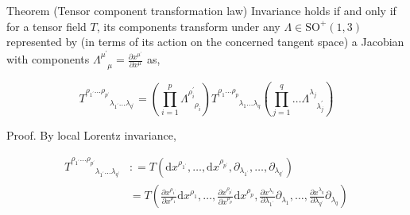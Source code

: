 \documentclass[9pt,handout]{beamer}
\begin{document}
\begin{frame}
\begin{block}{Theorem (Tensor component transformation law)}
Invariance holds if and only if for a tensor field $T$, its components transform under any $\Lambda \in \text{SO}^+ \left( 1, 3 \right)$ represented by (in terms of its action on the concerned tangent space) a Jacobian with components $\displaystyle{\Lambda^{\mu^\prime}_{\phantom{\mu^\prime} \mu} = \frac{\partial x^{\mu^\prime}}{\partial x^\mu}}$ as,

$$T^{\rho_{1^\prime} \dots \rho_{p^\prime}}_{\phantom{\rho_{1^\prime} \dots \rho_{p^\prime}} \lambda_{1^\prime} \dots \lambda_{q^\prime}} = \left( \prod_{i=1}^{p} \Lambda^{\rho_i^\prime}_{\phantom{\rho_i^\prime} \rho_i} \right) T^{\rho_1 \dots \rho_p}_{\phantom{\rho_1 \dots \rho_p} \lambda_1 \dots \lambda_q} \left( \prod_{j=1}^{q} \dots \Lambda^{\lambda_j}_{\phantom{\lambda_j} \lambda_j^\prime} \right)$$
\end{block}

\begin{block}{Proof.}
By local Lorentz invariance,

\begin{align*}
T^{\rho_{1^\prime} \dots \rho_{p^\prime}}_{\phantom{\rho_{1^\prime} \dots \rho_{p^\prime}} \lambda_{1^\prime} \dots \lambda_{q^\prime}} & : = T \left( \text{d}x^{\rho_{1^\prime}}, \dots, \text{d}x^{\rho_{p^\prime}}, \partial_{\lambda_{1^\prime}}, \dots, \partial_{\lambda_{q^\prime}} \right) \\
& = T \left( \frac{\partial x^{\rho_{1^\prime}}}{\partial x^{\rho_1}} \text{d}x^{\rho_1}, \dots, \frac{\partial x^{\rho_{p^\prime}}}{\partial x^{\rho_p}} \text{d}x^{\rho_p}, \frac{\partial x^{\lambda_1}}{\partial \lambda_{1^\prime}} \partial_{\lambda_1}, \dots, \frac{\partial x^{\lambda_q}}{\partial \lambda_{q^\prime}} \partial_{\lambda_q} \right)
\end{align*}
\end{block}
\end{frame}
\end{document}
